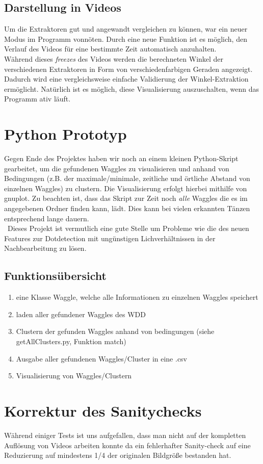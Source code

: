 \documentclass[11pt,a4paper]{article}
\begin{document}
\subsection{Darstellung in Videos}

Um die Extraktoren gut und angewandt vergleichen zu können, war ein neuer Modus im Programm vonnöten. Durch eine neue Funktion ist es möglich, den Verlauf des Videos für eine bestimmte Zeit automatisch anzuhalten.\\
Während dieses \textit{freezes} des Videos werden die berechneten Winkel der verschiedenen Extraktoren in Form von verschiedenfarbigen Geraden angezeigt.
Dadurch wird eine vergleichsweise einfache Validierung der Winkel-Extraktion ermöglicht. Natürlich ist es möglich, diese Visualisierung auszuschalten, wenn das Programm ativ läuft.

\section{Python Prototyp}
Gegen Ende des Projektes haben wir noch an einem kleinen Python-Skript gearbeitet, um die gefundenen Waggles zu visualisieren und anhand von Bedingungen (z.B. der maximale/minimale, zeitliche und örtliche Abstand von einzelnen Waggles) zu clustern. Die Visualisierung erfolgt hierbei mithilfe von gnuplot. Zu beachten ist, dass das Skript zur Zeit noch \emph{alle} Waggles die es im angegebenen Ordner finden kann, lädt. Dies kann bei vielen erkannten Tänzen entsprechend lange dauern.\\\
Dieses Projekt ist vermutlich eine gute Stelle um Probleme wie die des neuen Features zur Dotdetection mit ungünstigen Lichverhältnissen in der Nachbearbeitung zu lösen.

\subsection{Funktionsübersicht}
\begin{enumerate}
\item eine Klasse Waggle, welche alle Informationen zu einzelnen Waggles speichert
\item laden aller gefundener Waggles des WDD
\item Clustern der gefunden Waggles anhand von bedingungen (siehe getAllClusters.py, Funktion match)
\item Ausgabe aller gefundenen Waggles/Cluster in eine .csv
\item Visualisierung von Waggles/Clustern\\
\end{enumerate}

\section{Korrektur des Sanitychecks}
Während einiger Tests ist uns aufgefallen, dass man nicht auf der kompletten Auflösung von Videos arbeiten konnte da ein fehlerhafter Sanity-check auf eine Reduzierung auf mindestens 1/4 der originalen Bildgröße bestanden hat.
\end{document}
